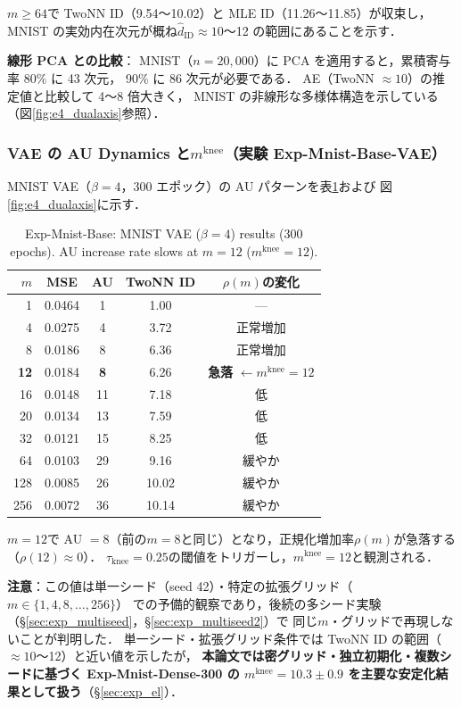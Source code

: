 \documentclass[11pt,a4paper]{jsarticle}
\newcommand{\mknee}{m^{\mathrm{knee}}}
\begin{document}
$m \geq 64$で TwoNN ID（9.54〜10.02）と MLE ID（11.26〜11.85）が収束し，
MNIST の実効内在次元が概ね$\hat{d}_\mathrm{ID} \approx 10$〜12 の範囲にあることを示す．

\textbf{線形 PCA との比較}：
MNIST（$n = 20{,}000$）に PCA を適用すると，累積寄与率 80\% に 43 次元，
90\% に 86 次元が必要である．
AE（TwoNN $\approx 10$）の推定値と比較して 4〜8 倍大きく，
MNIST の非線形な多様体構造を示している（図\ref{fig:e4_dualaxis}参照）．

\subsubsection{VAE の AU Dynamics と$\mknee$（実験 Exp-Mnist-Base-VAE）}

MNIST VAE（$\beta = 4$，300 エポック）の AU パターンを表\ref{tab:e4_vae}および
図\ref{fig:e4_dualaxis}に示す．

\begin{table}[H]
\centering
\caption{Exp-Mnist-Base: MNIST VAE ($\beta=4$) results (300 epochs). AU increase rate slows at $m=12$ ($\mknee=12$).}
\label{tab:e4_vae}
\small
\begin{tabular}{rcccc}
\toprule
$m$ & MSE & AU & TwoNN ID & $\rho(m)$の変化 \\
\midrule
1   & 0.0464 & 1  & 1.00 & --- \\
4   & 0.0275 & 4  & 3.72 & 正常増加 \\
8   & 0.0186 & 8  & 6.36 & 正常増加 \\
\textbf{12} & 0.0184 & \textbf{8}  & 6.26 & \textbf{急落} $\leftarrow \mknee = 12$ \\
16  & 0.0148 & 11 & 7.18 & 低 \\
20  & 0.0134 & 13 & 7.59 & 低 \\
32  & 0.0121 & 15 & 8.25 & 低 \\
64  & 0.0103 & 29 & 9.16 & 緩やか \\
128 & 0.0085 & 26 & 10.02 & 緩やか \\
256 & 0.0072 & 36 & 10.14 & 緩やか \\
\bottomrule
\end{tabular}
\end{table}

$m = 12$で AU $= 8$（前の$m = 8$と同じ）となり，正規化増加率$\rho(m)$が急落する（$\rho(12) \approx 0$）．
$\tau_{\mathrm{knee}} = 0.25$の閾値をトリガーし，$\mknee = 12$と観測される．

\textbf{注意}：この値は単一シード（seed 42）・特定の拡張グリッド（$m \in \{1,4,8,\ldots,256\}$）
での予備的観察であり，後続の多シード実験（§\ref{sec:exp_multiseed}，§\ref{sec:exp_multiseed2}）で
同じ$m$・グリッドで再現しないことが判明した．
単一シード・拡張グリッド条件では TwoNN ID の範囲（$\approx 10$〜12）と近い値を示したが，
\textbf{本論文では密グリッド・独立初期化・複数シードに基づく Exp-Mnist-Dense-300 の
$\mknee = 10.3 \pm 0.9$ を主要な安定化結果として扱う}（§\ref{sec:exp_el}）．
\end{document}
